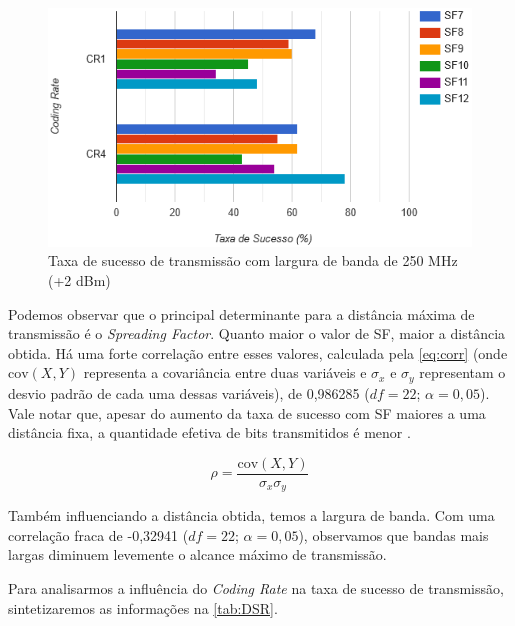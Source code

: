 \documentclass[
	12pt,				%
	openright,			%
	twoside,			%
	a4paper,			%
	english,			%
	french,				%
	spanish,			%
	brazil				%
	]{abntex2}
\begin{document}
\begin{figure}[H]
	\caption{\label{fig:CR250}Taxa de sucesso de transmissão com largura de banda de 250 MHz (+2 dBm)}
	\begin{center}
	    \includegraphics[scale=0.9]{img/CR250.png}
	\end{center}
\end{figure}

Podemos observar que o principal determinante para a distância máxima de transmissão é o \emph{Spreading Factor}. Quanto maior o valor de SF, maior a distância obtida. Há uma forte correlação entre esses valores, calculada pela \autoref{eq:corr} (onde $\text{cov} (X,Y)$ representa a covariância entre duas variáveis e $\sigma _{x}$ e $\sigma _{y}$ representam o desvio padrão de cada uma dessas variáveis), de 0,986285 ($df = 22$; $\alpha = 0,05$). Vale notar que, apesar do aumento da taxa de sucesso com SF maiores a uma distância fixa, a quantidade efetiva de bits transmitidos é menor \cite{cattani_2017}.

\begin{equation}
\label{eq:corr}
{\displaystyle \rho =\frac{\text{cov} (X,Y)}{\sigma _{x} \sigma _{y}}}
\end{equation}

Também influenciando a distância obtida, temos a largura de banda. Com uma correlação fraca de -0,32941 ($df = 22$; $\alpha = 0,05$), observamos que bandas mais largas diminuem levemente o alcance máximo de transmissão.

Para analisarmos a influência do \emph{Coding Rate} na taxa de sucesso de transmissão, sintetizaremos as informações na \autoref{tab:DSR}.
\end{document}
